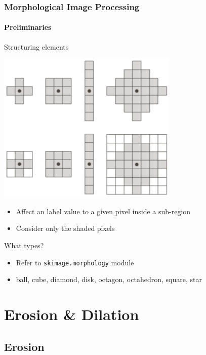 \documentclass{beamer}
\begin{document}
\begin{frame}
\frametitle{Morphological Image Processing}
\framesubtitle{Preliminaries}
\begin{block}{Structuring elements}\scriptsize
  \begin{center}
    \includegraphics[height=0.2\textheight]{images/se.png}
  \end{center}
    \begin{itemize}
    \item Affect an label value to a given pixel inside a sub-region 
    \item Consider only the shaded pixels
  \end{itemize}
\end{block}
\begin{block}{What types?}\scriptsize
  \begin{itemize}
    \item Refer to \texttt{skimage.morphology} module 
    \item ball, cube, diamond, disk, octagon, octahedron, square, star
  \end{itemize}
\end{block}
\end{frame}

\section{Erosion \& Dilation}

\subsection{Erosion}
\end{document}
